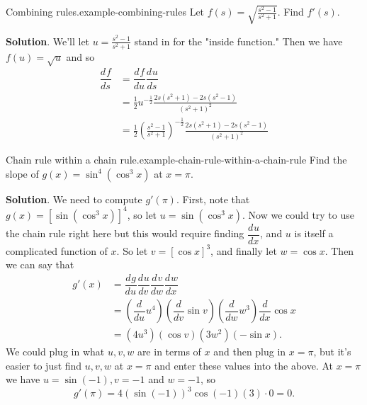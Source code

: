 \documentclass[10pt,]{book}
\numberwithin{equation}{section}
\newcommand{\dv}[3][]{\dfrac{d^{#1} #2}{d #3^{#1}}}
\begin{document}
\begin{example}{Combining rules.}{example-combining-rules}%
\hypertarget{p-154}{}%
Let \(f(s) = \sqrt{\frac{s^{2} - 1}{s^{2} + 1}}\). Find \(f'(s)\).%
\par\smallskip%
\noindent\textbf{Solution}.\hypertarget{solution-31}{}\quad%
\hypertarget{p-155}{}%
We'll let \(u = \frac{s^{2}-1}{s^{2}+1}\) stand in for the "inside function." Then we have \(f(u) = \sqrt{u}\) and so%
\begin{align*}
\dv{f}{s} & = \dv{f}{u}\dv{u}{s} \\
& = \frac{1}{2}u^{-\frac{1}{2}}\frac{2s(s^{2}+1) - 2s(s^{2}-1)}{(s^{2}+1)^{2}} \\
& = \frac{1}{2}\left(\frac{s^{2}-1}{s^{2}+1}\right)^{-\frac{1}{2}}\frac{2s(s^{2}+1) - 2s(s^{2}-1)}{(s^{2}+1)^{2}} 
\end{align*}
%
\end{example}
\begin{example}{Chain rule within a chain rule.}{example-chain-rule-within-a-chain-rule}%
\hypertarget{p-156}{}%
Find the slope of \(g(x) = \sin^{4}(\cos^{3}x)\) at \(x=\pi\).%
\par\smallskip%
\noindent\textbf{Solution}.\hypertarget{solution-32}{}\quad%
\hypertarget{p-157}{}%
We need to compute \(g'(\pi)\). First, note that \(g(x) = [\sin(\cos^{3}x)]^{4}\), so let \(u = \sin(\cos^{3}x)\). Now we could try to use the chain rule right here but this would require finding \(\dv{u}{x}\), and \(u\) is itself a complicated function of \(x\). So let \(v = [\cos x]^{3}\), and finally let \(w = \cos x\). Then we can say that%
\begin{align*}
g'(x) & = \dv{g}{u}\dv{u}{v}\dv{v}{w}\dv{w}{x} \\
& = \left(\dv{}{u}u^{4}\right)\left(\dv{}{v}\sin v\right)\left(\dv{}{w}w^{3}\right)\dv{}{x}\cos x \\
& = (4u^{3})(\cos v)(3w^{2})(-\sin x). 
\end{align*}
We could plug in what \(u,v,w\) are in terms of \(x\) and then plug in \(x=\pi\), but it's easier to just find \(u,v,w\) at \(x=\pi\) and enter these values into the above. At \(x=\pi\) we have \(u = \sin(-1), v = -1\) and \(w = -1\), so%
\begin{equation*}
g'(\pi) = 4(\sin(-1))^{3}\cos(-1)(3)\cdot0 = 0.
\end{equation*}
%
\end{example}
%
%
\typeout{************************************************}
\typeout{************************************************}
%
\end{document}
